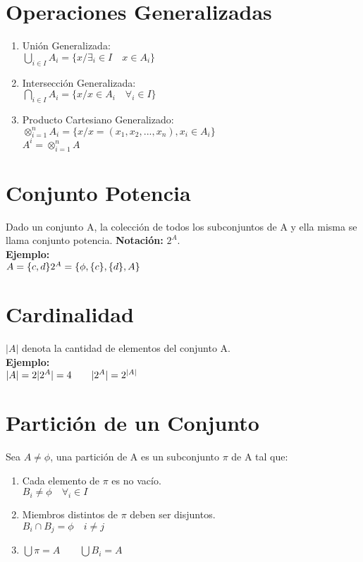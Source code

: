 \section{Operaciones Generalizadas}
\begin{enumerate}
\item Unión Generalizada:\\
	$\displaystyle\bigcup_{i\in I}A_i=\lbrace x/\exists_i \in I\quad x\in A_i \rbrace$
\item Intersección Generalizada:\\
	$\displaystyle\bigcap_{i\in I}A_i =\lbrace x/x \in A_i \quad \forall_i \in I\rbrace$
\item Producto Cartesiano Generalizado:\\
	$\otimes_{i=1}^n A_i=\lbrace x/x=(x_1,x_2,...,x_n),x_i\in A_i\rbrace$\\
	$A^i=\otimes_{i=1}^n A$
\end{enumerate}

\section{Conjunto Potencia}
Dado un conjunto A, la colección de todos los subconjuntos de A y ella misma se llama conjunto potencia. \textbf{Notación: }$2^A$. \\

\textbf{Ejemplo: }\\
	$A=\lbrace c,d\rbrace\\
	2^A=\lbrace \phi,\lbrace c\rbrace,\lbrace d\rbrace, A\rbrace$
\section{Cardinalidad}
$|A|$ denota la cantidad de elementos del conjunto A.\\
\textbf{Ejemplo: }\\
	$|A|=2\\
	|2^A|=4\quad \quad |2^A|=2^{|A|}$
\section{Partición de un Conjunto}
Sea $A\not=\phi$, una partición de A es un subconjunto $\pi$ de A tal que:
\begin{enumerate}
\item Cada elemento de $\pi$ es no vacío.\\
	$B_i\not=\phi \quad \forall_i \in I$
\item Miembros distintos de $\pi$ deben ser disjuntos.\\
	$B_i \cap B_j =\phi \quad i\not=j$
\item $\bigcup \pi=A \quad\quad \bigcup B_i=A$
\end{enumerate}

